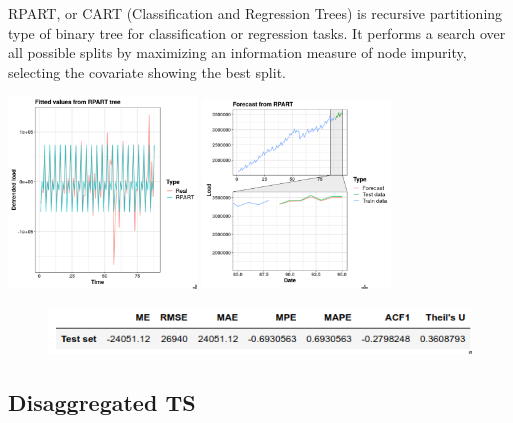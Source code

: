 \documentclass[c, dvipsnames]{beamer}  %
\begin{document}
\begin{frame}[shrink=5]
\frametitle{\insertsection} 
\framesubtitle{\insertsubsection}

RPART, or CART (Classification and Regression Trees) is recursive partitioning type of binary tree for classification or regression tasks. It performs a search over all possible splits by maximizing an information measure of node impurity, selecting the covariate showing the best split.


\hfil\hfil\includegraphics[width=5cm]{screenshot025}\hfil\hfil
\includegraphics[width=5cm]{screenshot026}\newline


%


\begin{figure}
	\centering
	\includegraphics[width=0.7\linewidth]{screenshot027}
	\label{fig:screenshot027}
\end{figure}

\end{frame}



\subsection{Disaggregated TS}
\end{document}
